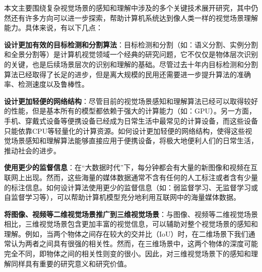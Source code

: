 本文主要围绕复杂视觉场景的感知和理解中涉及的多个关键技术展开研究，其中仍然还有许多方向可以进一步探索，帮助计算机系统达到像人类一样的视觉场景理解能力。具体来说，有以下几点：
\begin{asparaenum}
\item \textbf{设计更加有效的目标检测和分割算法}：目标检测和分割（如：语义分割、实例分割和全景分割等）是计算机视觉领域一个经典的研究问题，它不仅仅是物体层次识别的关键，也是后续场景层次的识别和理解的基础。尽管过去十年内目标检测和分割算法已经取得了长足的进步，但是离大规模的民用还需要进一步提升算法的准确率、检测速度以及鲁棒性。

\item \textbf{设计更加轻便的网络结构}：尽管目前的视觉场景感知和理解算法已经可以取得较好的性能，但是基本所有的模型都依赖于强大的计算能力（如：GPU）。另一方面，手机、穿戴式设备等便携设备已经成为日常生活中最常见的计算设备，而这些设备只能依靠CPU等轻量化的计算资源。如何设计更加轻便的网络结构，使得这些视觉场景感知和理解算法能够直接应用于便携设备，将极大地便利人们的日常生活，推动社会的进步。

\item \textbf{使用更少的监督信息}：在“大数据时代”下，每分钟都会有大量的新图像和视频在互联网上出现。然而，这些海量的媒体数据通常不含有任何的人工标注或者含有少量的标注信息。如何设计算法使用更少的监督信息（如：弱监督学习、无监督学习或自监督学习等），可以帮助计算机模型充分地利用互联网中的海量媒体数据。

\item \textbf{将图像、视频等二维视觉场景推广到三维视觉场景}：与图像、视频等二维视觉场景相比，三维视觉场景包含更加丰富的视觉信息，可以辅助对整个视觉场景的感知和理解。例如，当两个物体之间存在较大的交并比（IoU）时，在二维场景下我们通常认为两者之间具有很强的相关性。然而，在三维场景中，这两个物体的深度可能完全不同，即物体之间的相关性则变的很小。因此，对三维视觉场景下的感知和理解同样具有重要的研究意义和研究价值。

\end{asparaenum}
